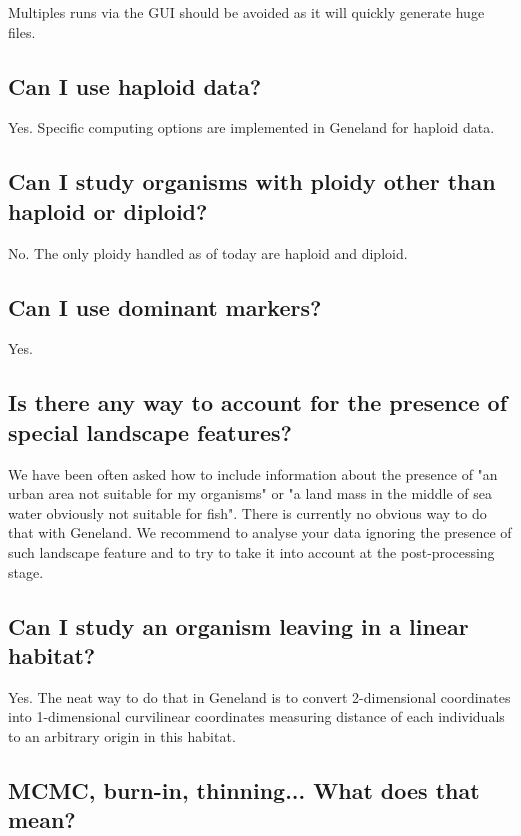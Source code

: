 \documentclass[a4paper,10pt]{article}
\begin{document}
Multiples runs via the GUI should be avoided as it will quickly generate huge files.


\subsection{Can I use haploid data?}
Yes. Specific computing options are implemented in {\sc Geneland} for haploid data. 

\subsection[Unusual ploidies]{Can I study organisms with ploidy other than haploid or diploid?}
No. The only ploidy handled as of today are haploid and diploid. 

\subsection{Can I use dominant markers?}
Yes. 

\subsection[Special landscape features]{Is there any way to account for the presence of special landscape features?}
We have been often asked how to include information about the presence of "an urban area not suitable for my organisms" 
or "a land mass in the middle of sea water obviously not suitable for fish". 
There is currently no obvious way to do that with {\sc Geneland}. 
We recommend to analyse your data ignoring the presence of such landscape feature and to  try to take it into account 
at the post-processing stage. 

\subsection[Linear habitat]{Can I study an organism leaving in a linear habitat?}
Yes. The neat way to do that in {\sc Geneland} is to convert 2-dimensional coordinates into 1-dimensional curvilinear coordinates measuring distance 
of each individuals to an arbitrary origin in this habitat.

\subsection[MCMC jargon]{MCMC, burn-in, thinning... What does that mean?}
\end{document}
